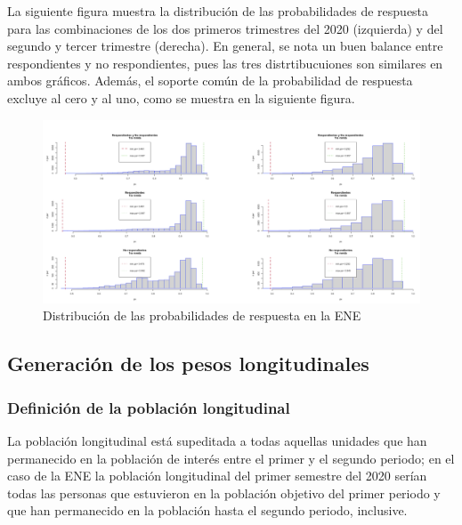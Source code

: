 \documentclass[
  10pt,
  spanish,
]{book}
\begin{document}
La siguiente figura muestra la distribución de las probabilidades de respuesta para las combinaciones de los dos primeros trimestres del 2020 (izquierda) y del segundo y tercer trimestre (derecha). En general, se nota un buen balance entre respondientes y no respondientes, pues las tres distrtibucuiones son similares en ambos gráficos. Además, el soporte común de la probabilidad de respuesta excluye al cero y al uno, como se muestra en la siguiente figura.

\begin{figure}
\centering
\includegraphics{Pics/el3.png}
\caption{Distribución de las probabilidades de respuesta en la ENE}
\end{figure}

\hypertarget{generaciuxf3n-de-los-pesos-longitudinales}{%
\subsection{Generación de los pesos longitudinales}\label{generaciuxf3n-de-los-pesos-longitudinales}}

\hypertarget{definiciuxf3n-de-la-poblaciuxf3n-longitudinal}{%
\subsubsection*{Definición de la población longitudinal}\label{definiciuxf3n-de-la-poblaciuxf3n-longitudinal}}

La población longitudinal está supeditada a todas aquellas unidades que han permanecido en la población de interés entre el primer y el segundo periodo; en el caso de la ENE la población longitudinal del primer semestre del 2020 serían todas las personas que estuvieron en la población objetivo del primer periodo y que han permanecido en la población hasta el segundo periodo, inclusive.
\end{document}
